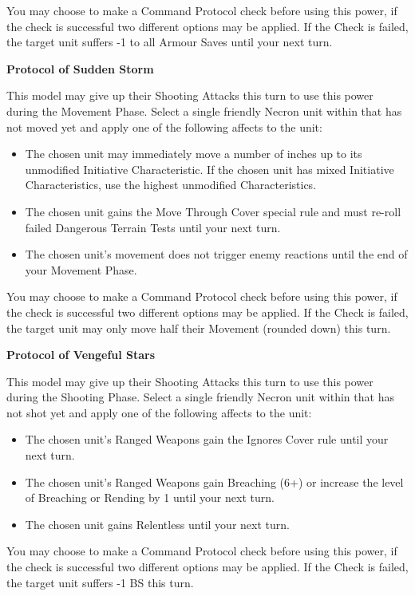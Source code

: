 \begin{multicols}{2}
You may choose to make a Command Protocol check before using this power, if the check is successful two different options may be applied. If the Check is failed, the target unit suffers -1 to all Armour Saves until your next turn.

\textbf{Protocol of Sudden Storm}

This model may give up their Shooting Attacks this turn to use this power during the Movement Phase. Select a single friendly Necron unit within  that has not moved yet and apply one of the following affects to the unit:

\begin{itemize}
	\itemsep 0pt
	\item The chosen unit may immediately move a number of inches up to its unmodified Initiative Characteristic. If the chosen unit has mixed Initiative Characteristics, use the highest unmodified Characteristics.
	\item The chosen unit gains the Move Through Cover special rule and must re-roll failed Dangerous Terrain Tests until your next turn.
	\item The chosen unit's movement does not trigger enemy reactions until the end of your Movement Phase.
\end{itemize}

You may choose to make a Command Protocol check before using this power, if the check is successful two different options may be applied. If the Check is failed, the target unit may only move half their Movement (rounded down) this turn.

\textbf{Protocol of Vengeful Stars}

This model may give up their Shooting Attacks this turn to use this power during the Shooting Phase. Select a single friendly Necron unit within  that has not shot yet and apply one of the following affects to the unit:

\begin{itemize}
	\itemsep 0pt
	\item The chosen unit's Ranged Weapons gain the Ignores Cover rule until your next turn.
	\item The chosen unit's Ranged Weapons gain Breaching (6+) or increase the level of Breaching or Rending by 1 until your next turn.
	\item The chosen unit gains Relentless until your next turn.
\end{itemize}

You may choose to make a Command Protocol check before using this power, if the check is successful two different options may be applied. If the Check is failed, the target unit suffers -1 BS this turn.


\end{multicols}
